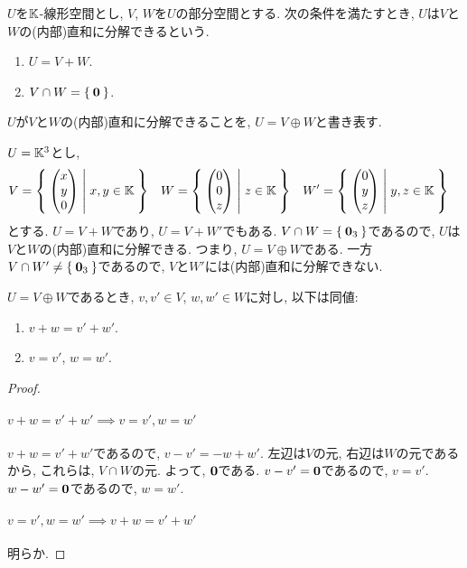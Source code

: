 \begin{definition}
  $U$を$\mathbb{K}$-線形空間とし,
  $V$, $W$を$U$の部分空間とする.
  次の条件を満たすとき,
  $U$は$V$と$W$の(内部)直和に分解できるという.
  \begin{enumerate}
  \item $U=V+W$.
  \item $V\cap W=\Set{\boldsymbol{0}}$.
  \end{enumerate}
  $U$が$V$と$W$の(内部)直和に分解できることを,
  $U=V\oplus W$と書き表す.
\end{definition}
\begin{example}
  $U=\mathbb{K}^3$とし,
  \begin{align*}
    V&=\Set{\begin{pmatrix}x\\y\\0\end{pmatrix}|x,y\in\mathbb{K}}&
    W&=\Set{\begin{pmatrix}0\\0\\z\end{pmatrix}|z\in\mathbb{K}}&
    W'&=\Set{\begin{pmatrix}0\\y\\z\end{pmatrix}|y,z\in\mathbb{K}}
  \end{align*}
  とする.
  $U=V+W$であり, $U=V+W'$でもある.
  $V\cap W=\Set{\boldsymbol{0}_3}$であるので,
  $U$は$V$と$W$の(内部)直和に分解できる.
  つまり, $U=V\oplus W$である.
  一方$V\cap W'\neq \Set{\boldsymbol{0}_3}$であるので,
  $V$と$W'$には(内部)直和に分解できない.
\end{example}

\begin{prop}
  $U=V\oplus W$であるとき,
  $v,v'\in V$,
  $w,w'\in W$に対し, 以下は同値:
  \begin{enumerate}
  \item $v+w=v'+w'$.
  \item $v=v'$, $w=w'$.
  \end{enumerate}
\end{prop}
\begin{proof}
  \paragraph{$v+w=v'+w'\implies v=v', w=w'$}
  $v+w=v'+w'$であるので,
  $v-v'=-w+w'$.
  左辺は$V$の元, 右辺は$W$の元であるから,
  これらは, $V\cap W$の元.
  よって, $\boldsymbol{0}$である.
  $v-v'=\boldsymbol{0}$であるので, $v=v'$.
  $w-w'=\boldsymbol{0}$であるので, $w=w'$.
  \paragraph{$v=v', w=w'\implies v+w=v'+w'$}
  明らか.
\end{proof}


